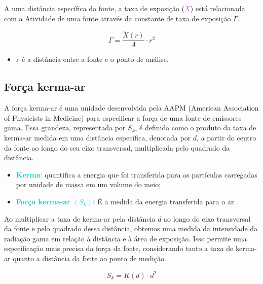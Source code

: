 \documentclass[11pt,a4paper]{article}
\newcounter{exemplo}
\begin{document}
			A uma distância específica da fonte, a taxa de exposição (\textbf{\textit{\textcolor{MediumOrchid}{$\dot{X}$}}}) está relacionada com a Atividade de uma fonte através da constante de taxa de exposição $\Gamma$.

				\begin{equation}
					\Gamma = \frac{\dot{X}(r)}{A} \cdot r^2
				\end{equation}

				\begin{exemplo}[onde,]
					\begin{itemize}
						\item \textcolor{DarkTurquoise}{$\mathbf{r}$} é a distância entre a fonte e o ponto de análise.
					\end{itemize}
				\end{exemplo}

\subsection*{Força kerma-ar}

	A força kerma-ar é uma unidade desenvolvida pela AAPM (American Association of Physicists in Medicine) para especificar a força de uma fonte de emissores gama. Essa grandeza, representada por $S_k$, é definida como o produto da taxa de kerma-ar medida em uma distância específica, denotada por $d$, a partir do centro da fonte ao longo do seu eixo transversal, multiplicada pelo quadrado da distância. 

			\begin{itemize}
				\item \textcolor{DarkTurquoise}{\textbf{Kerma}:} quantifica a energia que foi transferida para as partículas carregadas por unidade de massa em um volume do meio;
				\item \textcolor{DarkTurquoise}{\textbf{Força kerma-ar $(S_k)$:}} É a medida da energia transferida para o ar.
			\end{itemize}

	Ao multiplicar a taxa de kerma-ar pela distância $d$ ao longo do eixo transversal da fonte e pelo quadrado dessa distância, obtemos uma medida da intensidade da radiação gama em relação à distância e à área de exposição. Isso permite uma especificação mais precisa da força da fonte, considerando tanto a taxa de kerma-ar quanto a distância da fonte ao ponto de medição.

			\begin{equation}
				S_k = \dot{K}(d) \cdot d^2
			\end{equation}
\end{document}
